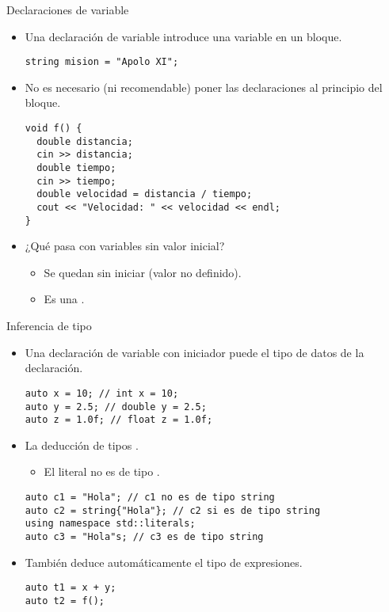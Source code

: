 \begin{frame}[t,fragile]{Declaraciones de variable}
\begin{itemize}
  \item Una declaración de variable introduce una variable en un bloque.
\begin{lstlisting}
string mision = "Apolo XI";
\end{lstlisting}
  \item No es necesario (ni recomendable) poner las declaraciones al principio del bloque.
\begin{lstlisting}
void f() {
  double distancia;
  cin >> distancia;
  double tiempo;
  cin >> tiempo;
  double velocidad = distancia / tiempo;
  cout << "Velocidad: " << velocidad << endl;
}  
\end{lstlisting}
  \item ¿Qué pasa con variables sin valor inicial?
    \begin{itemize}
      \item Se quedan sin iniciar (valor no definido).
      \item Es una .
    \end{itemize}
\end{itemize}
\end{frame}

\begin{frame}[t,fragile]{Inferencia de tipo}
\begin{itemize}
  \item Una declaración de variable con iniciador puede 
        el tipo de datos de la declaración.
\begin{lstlisting}
auto x = 10; // int x = 10;
auto y = 2.5; // double y = 2.5;
auto z = 1.0f; // float z = 1.0f;
\end{lstlisting}

  \item La deducción de tipos .
    \begin{itemize}
      \item El literal  no es de tipo .
    \end{itemize}
\begin{lstlisting}
auto c1 = "Hola"; // c1 no es de tipo string
auto c2 = string{"Hola"}; // c2 si es de tipo string
using namespace std::literals;
auto c3 = "Hola"s; // c3 es de tipo string
\end{lstlisting}

  \item También deduce automáticamente el tipo de expresiones.
\begin{lstlisting}
auto t1 = x + y;
auto t2 = f();
\end{lstlisting}
\end{itemize}
\end{frame}

